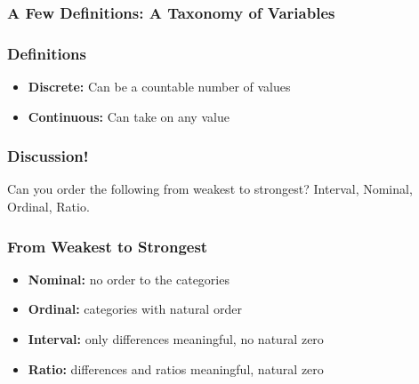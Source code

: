 \documentclass{beamer}
\begin{document}
\begin{frame}
\frametitle{A Few Definitions: A Taxonomy of Variables}
	\begin{figure}[htbp]
	\begin{center}
		\end{center}
	\end{figure}
\end{frame}

\begin{frame}
\frametitle{Definitions}
	\begin{itemize}
		\item \textbf{Discrete:} Can be a countable number of values
		\item \textbf{Continuous:} Can take on any value
	\end{itemize}
\end{frame}

\begin{frame}
\frametitle{Discussion!}
	Can you order the following from weakest to strongest? 
	\alert{Interval, Nominal, Ordinal, Ratio.}
\end{frame}

\begin{frame}
\frametitle{From Weakest to Strongest}
	\begin{itemize}[<+->]
		\item \textbf{Nominal:} no order to the categories
		\item \textbf{Ordinal:} categories with natural order
		\item \textbf{Interval:} only differences meaningful, no natural zero
		\item \textbf{Ratio:} differences and ratios meaningful, natural zero
	\end{itemize}
\end{frame}
\end{document}
